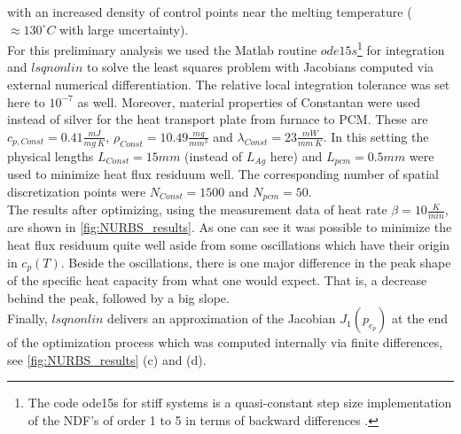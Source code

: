 \documentclass{scrartcl}[12pt, halfparskip]
\numberwithin{equation}{section}
\numberwithin{figure}{section}
\numberwithin{table}{section}
\begin{document}
with an increased density of control points near the melting temperature ($\approx 130^{\circ}C$ with large uncertainty). \\
For this preliminary analysis we used the Matlab routine $ode15s$\footnote{The code ode15s for stiff systems is a quasi-constant step size implementation of the NDF’s of order 1 to 5 in terms of backward differences \cite{matlab_ode_suite}.} for integration and $lsqnonlin$ to solve the least squares problem with Jacobians computed via external numerical differentiation. 
The relative local integration tolerance was set here to $10^{-7}$ as well. Moreover, material properties of Constantan were used instead of silver for the heat transport plate from furnace to PCM. These are $c_{p,Const}=0.41\frac{mJ}{mg \ K}$, $\rho_{Const}=10.49\frac{mg}{mm^3}$ and $\lambda_{Const}=23\frac{mW}{mm \ K}$. 
In this setting the physical lengths $L_{Const}=15mm$ (instead of $L_{Ag}$ here) and $L_{pcm}=0.5mm$ were used to minimize heat flux residuum well. The corresponding number of spatial discretization points were $N_{Const}=1500$ and $N_{pcm}=50$. \\
The results after optimizing, using the measurement data of heat rate $\beta = 10 \frac{K}{min}$, are shown in \cref{fig:NURBS_results}. As one can see it was possible to minimize the heat flux residuum quite well aside from some oscillations which have their origin in $c_p(T)$. 
Beside the oscillations, there is one major difference in the peak shape of the specific heat capacity from what one would expect. That is, a decrease behind the peak, followed by a big slope. \\

Finally, $lsqnonlin$ delivers an approximation of the Jacobian $J_1(p_{c_p})$ at the end of the optimization process which was computed internally via finite differences, see \cref{fig:NURBS_results} (c) and (d). 
\end{document}
